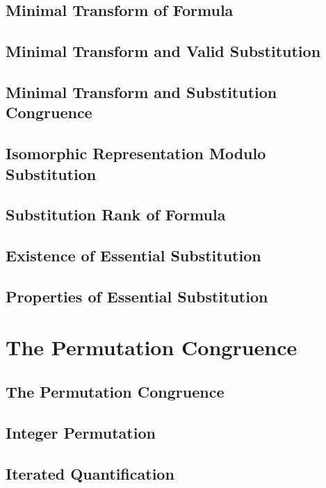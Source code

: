 \documentclass{report}
\begin{document}
    \subsection{Minimal Transform of Formula}
    \subsection{Minimal Transform and Valid Substitution}
    \subsection{Minimal Transform and Substitution Congruence}
    \subsection{Isomorphic Representation Modulo Substitution}
    \subsection{Substitution Rank of Formula}
    \subsection{Existence of Essential Substitution}
    \subsection{Properties of Essential Substitution}
\section{The Permutation Congruence}
    \subsection{The Permutation Congruence}
    \subsection{Integer Permutation}
    \subsection{Iterated Quantification}
\end{document}
